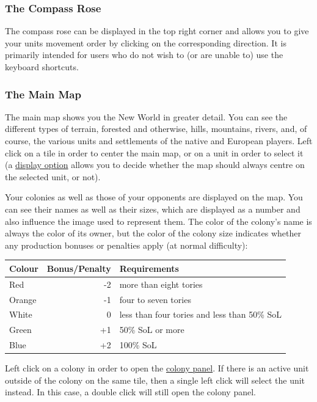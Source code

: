 \documentclass[12pt]{article}
\begin{document}
\hypertarget{compass rose}{\subsubsection{The Compass Rose}}

The compass rose can be displayed in the top right corner and allows
you to give your units movement order by clicking on the corresponding
direction. It is primarily intended for users who do not wish to (or
are unable to) use the keyboard shortcuts.


\hypertarget{main map}{\subsubsection{The Main Map}}

The main map shows you the New World in greater detail. You can see
the different types of terrain, forested and otherwise, hills,
mountains, rivers, and, of course, the various units and settlements
of the native and European players. Left click on a tile in order to
center the main map, or on a unit in order to select it (a
\hyperlink{display options}{display option} allows you to decide
whether the map should always centre on the selected unit, or
not). 

Your colonies as well as those of your opponents are displayed on the
map. You can see their names as well as their sizes, which are
displayed as a number and also influence the image used to represent
them. The color of the colony's name is always the color of its owner,
but the color of the colony size indicates whether any production
bonuses or penalties apply (at normal difficulty):

\vskip5mm

\begin{tabular}{l r l}
Colour&Bonus/Penalty&Requirements\\
\hline
Red    & -2 & more than eight tories\\
Orange & -1 & four to seven tories\\
White  &  0 & less than four tories and less than 50\% SoL\\
Green  & +1 & 50\% SoL or more\\
Blue   & +2 & 100\% SoL\\
\end{tabular}

\vskip5mm

Left click on a colony in order to open the \hyperlink{colony
  panel}{colony panel}. If there is an active unit outside of the
colony on the same tile, then a single left click will select the unit
instead. In this case, a double click will still open the colony
panel.
\end{document}
